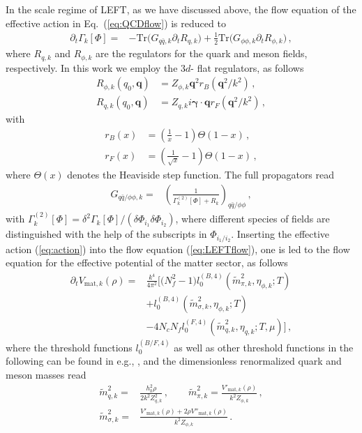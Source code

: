 \documentclass[%
reprint,
superscriptaddress,
showpacs,preprintnumbers,
 amsmath,amssymb,
 aps,
prd,
]{revtex4-1}
\def\Eq#1{Eq.~(\ref{#1})}
\def\eq#1{(\ref{#1})}
\begin{document}
In the scale regime of LEFT, as we have discussed above, the flow equation of the effective action in \Eq{eq:QCDflow} is reduced to 
%
\begin{align}
\partial_t\Gamma_k[\Phi]=&-\mathrm{Tr}\Big(G_{q\bar q,k}\partial_t R_{q,k}\Big)+\frac{1}{2}\mathrm{Tr}\Big(G_{\phi\phi,k}\partial_t R_{\phi,k}\Big)\,,\label{eq:LEFTflow}
\end{align}
%
where $R_{q,k}$ and $R_{\phi,k}$ are the regulators for the quark and meson fields, respectively. In this work we employ the $3d$- flat regulators, as follows
\begin{align}
  R_{\phi,k}(q_0,\bm{q})&=Z_{\phi,k}\bm{q}^2 r_B(\bm{q}^2/k^2)\,, \label{eq:Rphi}\\[2ex] 
  R_{q,k}(q_0,\bm{q})&=Z_{q,k}i\bm{\gamma} \cdot \bm{q} r_F(\bm{q}^2/k^2)\,, \label{eq:Rq}
\end{align} 
with 
\begin{align}
  r_B(x)&=\left( \frac{1}{x}-1 \right)\Theta(1-x)\,,\\[2ex] 
  r_F(x)&=\left( \frac{1}{\sqrt{x}}-1 \right)\Theta(1-x)\,,  \label{}
\end{align} 
where $\Theta(x)$ denotes the Heaviside step function. The full propagators read
%
\begin{align}
G_{q\bar q/\phi\phi,k}=&\left(\frac{1}{\Gamma^{(2)}_k[\Phi]+R_k}\right)_{q\bar q/\phi\phi}\,,\label{}
\end{align}
%
with $\Gamma^{(2)}_k[\Phi]=\delta^2\Gamma_k[\Phi]/(\delta \Phi_{i_1}\delta \Phi_{i_2})$, where different species of fields are distinguished with the help of the subscripts in $\Phi_{i_1/i_2}$. Inserting the effective action \eq{eq:action} into the flow equation \eq{eq:LEFTflow}, one is led to the flow equation for the effective potential of the matter sector, as follows
%
\begin{align}
  \partial_t V_{\mathrm{mat},k}(\rho)=&\frac{k^4}{4\pi^2} \bigg [\big(N^2_f-1\big) l^{(B,4)}_{0}(\tilde{m}^{2}_{\pi,k},\eta_{\phi,k};T)\nonumber\\[2ex]
&+l^{(B,4)}_{0}(\tilde{m}^{2}_{\sigma,k},\eta_{\phi,k};T)\nonumber\\[2ex]
&-4N_c N_f l^{(F,4)}_{0}(\tilde{m}^{2}_{q,k},\eta_{q,k};T,\mu)\bigg]\,, \label{eq:flowV}
\end{align}
%
where the threshold functions $l^{(B/F,4)}_{0}$ as well as other threshold functions in the following can be found in e.g., \cite{Fu:2019hdw,Yin:2019ebz}, and the dimensionless renormalized quark and meson masses read
%
\begin{align}
  \tilde{m}^{2}_{q,k}=&\frac{h^{2}_{k}\rho}{2k^2Z^{2}_{q,k}}\,, \qquad \tilde{m}^{2}_{\pi,k}=\frac{V'_{\mathrm{mat},k}(\rho)}{k^2 Z_{\phi,k}}\,, \\[2ex]
  \tilde{m}^{2}_{\sigma,k}=&\frac{V'_{\mathrm{mat},k}(\rho)+2\rho V''_{\mathrm{mat},k}(\rho)}{k^2 Z_{\phi,k}}\,.\label{}
\end{align}
%
\end{document}
